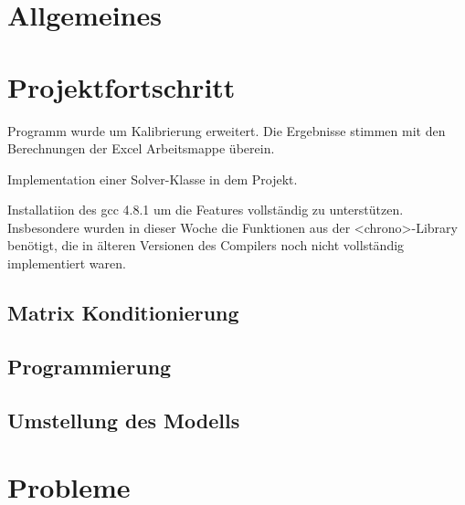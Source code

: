 \documentclass[a4paper,12pt,fleqn]{article}
\begin{document}
\setlength{\headheight}{36pt}

\begin{titlepage}



\end{titlepage}

\section[Allgemeines]{Allgemeines}
%
\section[Fortschritt]{Projektfortschritt}
%
Programm wurde um Kalibrierung erweitert. Die Ergebnisse stimmen mit den Berechnungen der Excel Arbeitsmappe überein.

Implementation einer Solver-Klasse in dem Projekt. 

Installatiion des gcc 4.8.1 um die  Features vollständig zu unterstützen. Insbesondere wurden in dieser Woche die Funktionen aus der <chrono>-Library benötigt, die in älteren Versionen des Compilers noch nicht vollständig implementiert waren.

\subsection{Matrix Konditionierung}
%
\subsection{Programmierung}

%
\subsection{Umstellung des Modells}
%
\section{Probleme}
\label{Problems}
%


\newpage


\end{document}
